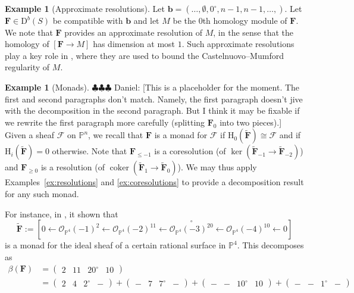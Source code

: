 \documentclass[12pt]{amsart}
\theoremstyle{definition}
\newtheorem{example}[lemma]{Example}
\theoremstyle{remark}
\newcommand{\coker}{\operatorname{coker}}
\newcommand{\PP}{\mathbb{P}}
\newcommand{\HH}{\mathrm{H}}
\newcommand{\bb}{\mathbf{b}}
\newcommand{\cO}{\mathcal{O}}
\newcommand{\cF}{\mathcal{F}}
\newcommand{\FF}{\mathbf{F}}
\newcommand{\zp}{\circ}
\newcommand{\DD}{\mathrm{D}}
\newcommand{\daniel}[1]{{\color{green} \sf $\clubsuit\clubsuit\clubsuit$ Daniel: [#1]}}
\begin{document}
\begin{example}[Approximate resolutions]
Let $\bb=(\dots,\emptyset,0^\zp,n-1,n-1,\dots,)$.   Let $\FF\in \DD^b(S)$ be compatible with $\bb$ and let $M$ be the $0$th homology module of $\FF$.  We note that $\FF$ provides an approximate resolution of $M$, in the sense that the homology of $[\FF\to M]$ has dimension at most $1$.  Such approximate resolutions play a key role in \cite[Lemma~1.6]{gruson-lazarsfeld-peskine}, where they are used to bound the Castelnuovo--Mumford regularity of $M$.
\end{example}

\begin{example}[Monads]\daniel{This is a placeholder for the moment.  The first and second paragraphs don't match.  Namely, the first paragraph doesn't jive with the decomposition in the second paragraph.  But I think it may be fixable if we rewrite the first paragraph more carefully (splitting $\FF_0$ into two pieces).}
Given a sheaf $\cF$ on $\PP^n$, we recall that $\FF$ is a monad for $\cF$ if $\HH_0(\widetilde{\FF})\cong \cF$ and if $\HH_i(\widetilde{\FF})=0$ otherwise.  Note that $\FF_{\leq -1}$ is a coresolution (of $\ker\left(\widetilde{\FF}_{-1}\to \widetilde{\FF}_{-2}\right)$) and $\FF_{\geq 0}$ is a resolution (of $\coker\left(\widetilde{\FF}_{1}\to \widetilde{\FF}_{0}\right)$).  We may thus apply Examples~\ref{ex:resolutions} and \ref{ex:coresolutions} to provide a decomposition result for any such monad.

For instance, in \cite[Example 8.2]{eis-floy-schrey}, it shown that
\[
\widetilde{\FF}:=\left[0\gets \cO_{\PP^4}(-1)^2 \gets  \cO_{\PP^4}(-2)^{11}\gets \overset{\zp}{\cO_{\PP^4}(-3)^{20}}\gets \cO_{\PP^4}(-4)^{10}\gets 0 \right]
\]
is a monad for the ideal sheaf of a certain rational surface in $\PP^4$.  This decomposes as
\begin{align*}
\beta(\FF)&=
\begin{pmatrix}
2&11&20^\zp&10
\end{pmatrix}
\\
&=
\begin{pmatrix}
2&4&2^\zp&-
\end{pmatrix}
+
\begin{pmatrix}
-&7&7^\zp&-
\end{pmatrix}
+
\begin{pmatrix}
-&-&10^\zp&10
\end{pmatrix}
+
\begin{pmatrix}
-&-&1^\zp&-
\end{pmatrix}
\end{align*}
\end{example}
\end{document}
